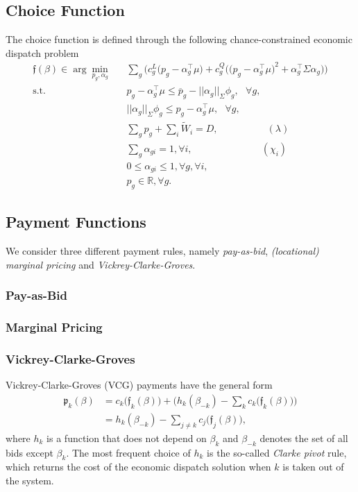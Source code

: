 \documentclass{article}
\begin{document}
\subsection{Choice Function}

The choice function is defined through the following chance-constrained economic dispatch problem
\begin{align}
\mathfrak{f}(\beta) \in \arg \underset{p_g, \alpha_g}{\min} \hspace{10pt} & \sum_g \Big(c_g^L\big(p_g - \alpha_g^\top \mu\big) + c_g^Q \Big(\big(p_g - \alpha_g^\top \mu \big)^2 + \alpha_g^\top \Sigma \alpha_g\Big)\Big)\\
\mbox{s.t. } & p_g - \alpha_g^\top \mu\le \overline{p}_g - ||\alpha_g||_{\Sigma} \phi_g, \mbox{ }\forall g,\\
& ||\alpha_g||_{\Sigma} \phi_g \le p_g - \alpha_g^\top \mu, \mbox{ }\forall g,\\
& \sum_g p_g + \sum_i \tilde{W}_i = D, \hspace{60pt} (\lambda)\\
& \sum_g \alpha_{gi} = 1, \forall i, \hspace{85pt} (\chi_i)\\
& 0 \le \alpha_{gi} \le 1, \forall g, \forall i,\\
& p_g \in \mathbb{R}, \forall g.
\end{align}

\subsection{Payment Functions}

We consider three different payment rules, namely \textit{pay-as-bid}, \textit{(locational) marginal pricing} and \textit{Vickrey-Clarke-Groves}.

\subsubsection{Pay-as-Bid}

\subsubsection{Marginal Pricing}

\subsubsection{Vickrey-Clarke-Groves}

Vickrey-Clarke-Groves (VCG) payments have the general form
\begin{align*}
\mathfrak{p}_k(\beta) &= c_k\big(\mathfrak{f}_k(\beta)\big) + \Big(h_k(\beta_{-k}) - \sum_{k} c_k\big(\mathfrak{f}_k(\beta)\big) \Big)\\
&= h_k(\beta_{-k}) - \sum_{j \ne k} c_j\big(\mathfrak{f}_j(\beta)\big),
\end{align*}
where $h_k$ is a function that does not depend on $\beta_k$ and $\beta_{-k}$ denotes the set of all bids except $\beta_k$. The most frequent choice of $h_k$ is the so-called \textit{Clarke pivot} rule, which returns the cost of the economic dispatch solution when $k$ is taken out of the system. 
\end{document}
